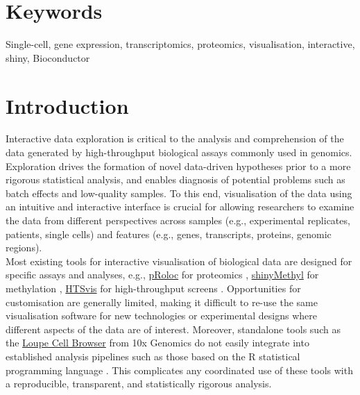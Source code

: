 \documentclass[10pt,a4paper,twocolumn]{article}
\begin{document}
\section*{Keywords}


Single-cell, gene expression, transcriptomics, proteomics, visualisation, interactive, shiny, Bioconductor


\clearpage

\section*{Introduction}
Interactive data exploration is critical to the analysis and comprehension of the data generated by high-throughput biological assays commonly used in genomics.
Exploration drives the formation of novel data-driven hypotheses prior to a more rigorous statistical analysis, and enables diagnosis of potential problems such as batch effects and low-quality samples.
To this end, visualisation of the data using an intuitive and interactive interface is crucial for allowing researchers to examine the data from different perspectives across samples (e.g., experimental replicates, patients, single cells) and features (e.g., genes, transcripts, proteins, genomic regions).\\

Most existing tools for interactive visualisation of biological data are designed for specific assays and analyses, e.g., \href{https://bioconductor.org/packages/release/bioc/html/pRoloc.html}{pRoloc} for proteomics \citep{gatto2014mass}, \href{http://bioconductor.org/packages/release/bioc/html/shinyMethyl.html}{shinyMethyl} for methylation \citep{fortin2014shinymethyl}, \href{http://htsvis.dkfz.de/HTSvis/}{HTSvis} for high-throughput screens \citep{scheeder2017htsvis}.
Opportunities for customisation are generally limited, making it difficult to re-use the same visualisation software for new technologies or experimental designs where different aspects of the data are of interest.
Moreover, standalone tools such as the \href{https://support.10xgenomics.com/single-cell-gene-expression/software/visualization/latest/what-is-loupe-cell-browser}{Loupe Cell Browser} from 10x Genomics \citep{zheng2017massively} do not easily integrate into established analysis pipelines such as those based on the R statistical programming language \citep{rcore2008R}.
This complicates any coordinated use of these tools with a reproducible, transparent, and statistically rigorous analysis.\\
\end{document}
